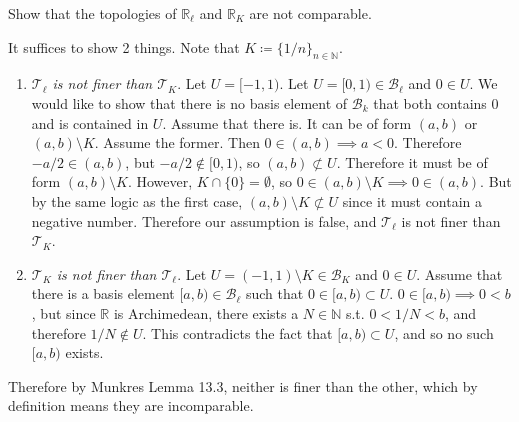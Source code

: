   \begin{exercise}[Munkres 13.6]
    Show that the topologies of $\mathbb{R}_\ell$ and $\mathbb{R}_K$ are not comparable.
  \end{exercise}
  \begin{solution}[Munkres 13.6]
    It suffices to show 2 things. Note that $K \coloneqq \{ 1/n \}_{n \in \mathbb{N}}$. 
    \begin{enumerate}
      \item \textit{$\mathcal{T}_\ell$ is not finer than $\mathcal{T}_K$}. Let $U = [-1, 1)$. Let $U = [0, 1) \in \mathscr{B}_\ell$ and $0 \in U$. We would like to show that there is no basis element of $\mathscr{B}_k$ that both contains $0$ and is contained in $U$. Assume that there is. It can be of form $(a, b)$ or $(a, b) \setminus K$. Assume the former. Then $0 \in (a, b) \implies a < 0$. Therefore $-a/2 \in (a, b)$, but $-a/2 \not\in [0, 1)$, so $(a, b) \not\subset U$. Therefore it must be of form $(a, b) \setminus K$. However, $K \cap \{0\} = \emptyset$, so $0 \in (a, b) \setminus K \implies 0 \in (a, b)$. But by the same logic as the first case, $(a, b) \setminus K \not\subset U$ since it must contain a negative number. Therefore our assumption is false, and $\mathcal{T}_{\ell}$ is not finer than $\mathcal{T}_K$. 
      \item \textit{$\mathcal{T}_K$ is not finer than $\mathcal{T}_\ell$}. Let $U = (-1, 1) \setminus K \in \mathscr{B}_K$ and $0 \in U$. Assume that there is a basis element $[a, b) \in \mathscr{B}_\ell$ such that $0 \in [a, b) \subset U$. $0 \in [a, b) \implies 0 < b$, but since $\mathbb{R}$ is Archimedean, there exists a $N \in \mathbb{N}$ s.t. $0 < 1/N < b$, and therefore $1/N \not\in U$. This contradicts the fact that $[a, b) \subset U$, and so no such $[a, b)$ exists. 
    \end{enumerate}
    Therefore by Munkres Lemma 13.3, neither is finer than the other, which by definition means they are incomparable. 
  \end{solution}


